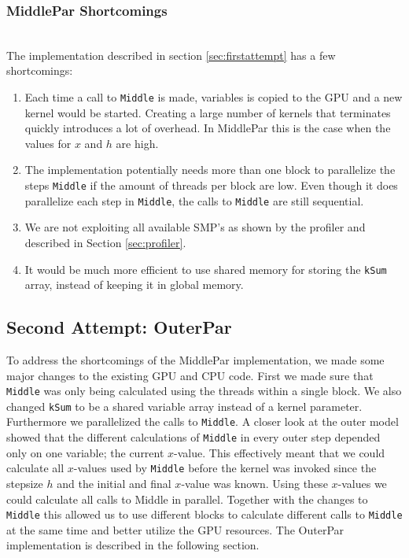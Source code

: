 \subsubsection{MiddlePar Shortcomings} \hfill \\
\label{label:shortages}
The implementation described in section \ref{sec:firstattempt} has a few shortcomings:
\begin{enumerate}
	\item Each time a call to \texttt{Middle} is made, variables is copied to the GPU and a new kernel would be started. Creating a large number of kernels that terminates quickly introduces a lot of overhead. In MiddlePar this is the case when the values for $x$ and $h$ are high.
	\item The implementation potentially needs more than one block to parallelize the steps \texttt{Middle} if the amount of threads per block are low. Even though it does parallelize each step in \texttt{Middle}, the calls to \texttt{Middle} are still sequential.
	\item We are not exploiting all available SMP's as shown by the profiler and described in Section \ref{sec:profiler}.
	\item It would be much more efficient to use shared memory for storing the \texttt{kSum} array, instead of keeping it in global memory.
\end{enumerate}

\subsection{Second Attempt: OuterPar}
To address the shortcomings of the MiddlePar implementation, we made some major changes to the existing GPU and CPU code. First we made sure that \texttt{Middle} was only being calculated using the threads within a single block. We also changed \texttt{kSum} to be a shared variable array instead of a kernel parameter. \\

Furthermore we parallelized the calls to \texttt{Middle}. A closer look at the outer model showed that the different calculations of \texttt{Middle} in every outer step depended only on one variable; the current $x$-value. This effectively meant that we could calculate all $x$-values used by \texttt{Middle} before the kernel was invoked since the stepsize $h$ and the initial and final $x$-value was known. Using these $x$-values we could calculate all calls to Middle in parallel. Together with the changes to \texttt{Middle} this allowed us to use different blocks to calculate different calls to \texttt{Middle} at the same time and better utilize the GPU resources. The OuterPar implementation is described in the following section.

